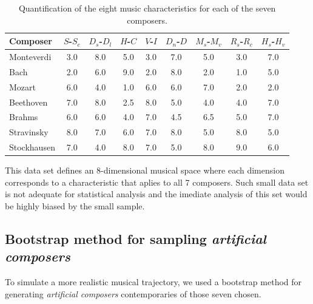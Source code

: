 \documentclass[
 aip,
 jmp,
 amsmath,amssymb,
 reprint,
]{revtex4-1}
\begin{document}
\begin{table}[ht]

\caption{\label{tab:tableA}Quantification of the
eight music characteristics for each of the seven composers.}

\begin{ruledtabular}
\begin{tabular}{|l|c|c|c|c|c|c|c|c|}
\footnotesize
\footnotesize Composer    & \tiny  $S$-$S_c$ & \tiny  $D_s$-$D_l$ & \tiny  $H$-$C$ & \tiny  $V$-$I$ & \tiny  $D_n$-$D$ & \tiny  $M_s$-$M_v$ & \tiny  $R_s$-$R_c$ & \tiny  $H_s$-$H_v$  \\
\hline
 \footnotesize Monteverdi   & 3.0 & 8.0 & 5.0 & 3.0 & 7.0 & 5.0 & 3.0 & 7.0  \\
 \footnotesize Bach         & 2.0 & 6.0 & 9.0 & 2.0 & 8.0 & 2.0 & 1.0 & 5.0  \\
 \footnotesize Mozart       & 6.0 & 4.0 & 1.0 & 6.0 & 6.0 & 7.0 & 2.0 & 2.0  \\
 \footnotesize Beethoven    & 7.0 & 8.0 & 2.5 & 8.0 & 5.0 & 4.0 & 4.0 & 7.0  \\
 \footnotesize Brahms       & 6.0 & 6.0 & 4.0 & 7.0 & 4.5 & 6.5 & 5.0 & 7.0  \\
 \footnotesize Stravinsky   & 8.0 & 7.0 & 6.0 & 7.0 & 8.0 & 5.0 & 8.0 & 5.0  \\
 \footnotesize Stockhausen  & 7.0 & 4.0 & 8.0 & 7.0 & 5.0 & 8.0 & 9.0 & 6.0  \\

\end{tabular}
\end{ruledtabular}
\end{table}

This data set defines an 8-dimensional musical space where each dimension
corresponds to a characteristic that aplies to all 7 composers. 
Such small data set is not adequate for statistical analysis and the imediate analysis of this set would
be highly biased by the small sample.

\subsection{Bootstrap method for sampling \emph{artificial composers}}

To simulate a more realistic musical trajectory, we used a bootstrap
method for generating \emph{artificial composers} contemporaries of those seven chosen.
\end{document}
